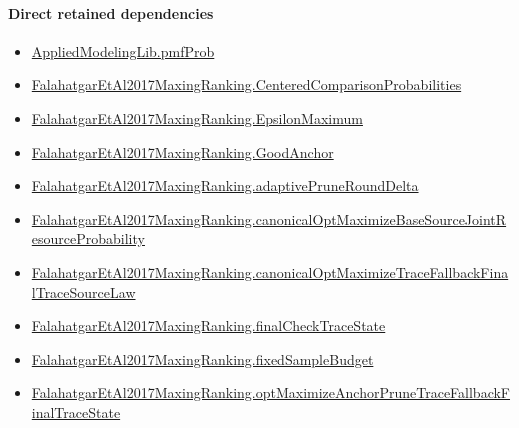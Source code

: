 \documentclass[10pt]{article}
\begin{document}
\paragraph{Direct retained dependencies}
\begin{itemize}\raggedright
\item \hyperlink{governing-declaration-9c38d53b9d664221}{Applied\allowbreak{}Modeling\allowbreak{}Lib.\allowbreak{}pmf\allowbreak{}Prob}
\item \hyperlink{paper-prerequisite-b99b697ef57f53ce}{Falahatgar\allowbreak{}Et\allowbreak{}Al2017\allowbreak{}Maxing\allowbreak{}Ranking.\allowbreak{}Centered\allowbreak{}Comparison\allowbreak{}Probabilities}
\item \hyperlink{paper-prerequisite-f40acf814741691d}{Falahatgar\allowbreak{}Et\allowbreak{}Al2017\allowbreak{}Maxing\allowbreak{}Ranking.\allowbreak{}Epsilon\allowbreak{}Maximum}
\item \hyperlink{paper-prerequisite-46128be8e1edb4b6}{Falahatgar\allowbreak{}Et\allowbreak{}Al2017\allowbreak{}Maxing\allowbreak{}Ranking.\allowbreak{}Good\allowbreak{}Anchor}
\item \hyperlink{governing-declaration-0a2d9c4ad2e46f08}{Falahatgar\allowbreak{}Et\allowbreak{}Al2017\allowbreak{}Maxing\allowbreak{}Ranking.\allowbreak{}adaptive\allowbreak{}Prune\allowbreak{}Round\allowbreak{}Delta}
\item \hyperlink{governing-declaration-778d5133084c8c70}{Falahatgar\allowbreak{}Et\allowbreak{}Al2017\allowbreak{}Maxing\allowbreak{}Ranking.\allowbreak{}canonical\allowbreak{}Opt\allowbreak{}Maximize\allowbreak{}Base\allowbreak{}Source\allowbreak{}Joint\allowbreak{}Resource\allowbreak{}Probability}
\item \hyperlink{governing-declaration-2ee65ec9ca789fc8}{Falahatgar\allowbreak{}Et\allowbreak{}Al2017\allowbreak{}Maxing\allowbreak{}Ranking.\allowbreak{}canonical\allowbreak{}Opt\allowbreak{}Maximize\allowbreak{}Trace\allowbreak{}Fallback\allowbreak{}Final\allowbreak{}Trace\allowbreak{}Source\allowbreak{}Law}
\item \hyperlink{governing-declaration-2122ec79de2b6bf8}{Falahatgar\allowbreak{}Et\allowbreak{}Al2017\allowbreak{}Maxing\allowbreak{}Ranking.\allowbreak{}final\allowbreak{}Check\allowbreak{}Trace\allowbreak{}State}
\item \hyperlink{governing-declaration-4b4daf4bb2493573}{Falahatgar\allowbreak{}Et\allowbreak{}Al2017\allowbreak{}Maxing\allowbreak{}Ranking.\allowbreak{}fixed\allowbreak{}Sample\allowbreak{}Budget}
\item \hyperlink{governing-declaration-25e49fb93f2a2a90}{Falahatgar\allowbreak{}Et\allowbreak{}Al2017\allowbreak{}Maxing\allowbreak{}Ranking.\allowbreak{}opt\allowbreak{}Maximize\allowbreak{}Anchor\allowbreak{}Prune\allowbreak{}Trace\allowbreak{}Fallback\allowbreak{}Final\allowbreak{}Trace\allowbreak{}State}

\end{itemize}
\end{document}
